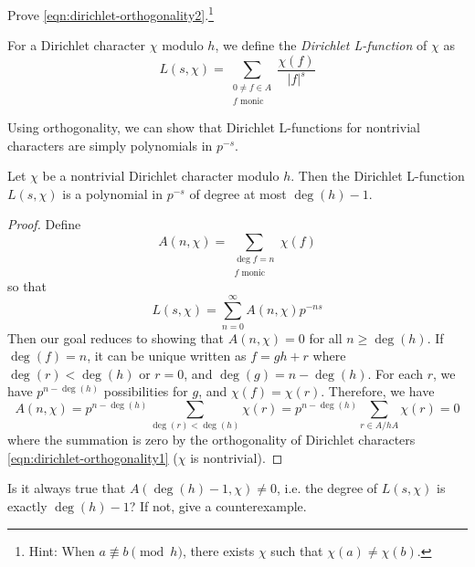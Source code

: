 \begin{exercise}
    Prove \eqref{eqn:dirichlet-orthogonality2}.\footnote{Hint: When $a \not\equiv b \pmod{h}$, there exists $\chi$ such that $\chi(a) \ne \chi(b)$.}
\end{exercise}

\begin{definition}
    For a Dirichlet character $\chi$ modulo $h$, we define the \emph{Dirichlet L-function} of $\chi$ as
    \begin{equation}
        L(s, \chi) = \sum_{\substack{0 \ne f \in A \\ f\text{ monic}}} \frac{\chi(f)}{|f|^s}
        \label{eqn:dirichlet-l-function}
    \end{equation}
\end{definition}

Using orthogonality, we can show that Dirichlet L-functions for nontrivial characters are simply polynomials in $p^{-s}$.
\begin{proposition}
    \label{prop:dirichlet-l-function-poly}
    Let $\chi$ be a nontrivial Dirichlet character modulo $h$.
    Then the Dirichlet L-function $L(s, \chi)$ is a polynomial in $p^{-s}$ of degree at most $\deg(h) - 1$.
\end{proposition}
\begin{proof}
    Define
    \begin{equation}
        A(n, \chi) = \sum_{\substack{\deg f = n \\ f\text{ monic}}} \chi(f)
    \end{equation}
    so that
    \begin{equation}
        L(s, \chi) = \sum_{n = 0}^{\infty} A(n, \chi) p^{-ns}
    \end{equation}
    Then our goal reduces to showing that $A(n, \chi) = 0$ for all $n \geq \deg(h)$.
    If $\deg(f) = n$, it can be unique written as $f = g h + r$ where $\deg(r) < \deg(h)$ or $r = 0$, and $\deg(g) = n - \deg(h)$.
    For each $r$, we have $p^{n - \deg(h)}$ possibilities for $g$, and $\chi(f) = \chi(r)$.
    Therefore, we have
    \[
    A(n, \chi) = p^{n - \deg (h)}\sum_{\deg(r) < \deg(h)} \chi(r) = p^{n - \deg (h)} \sum_{r \in A / hA} \chi(r) = 0
    \]
    where the summation is zero by the orthogonality of Dirichlet characters \eqref{eqn:dirichlet-orthogonality1} ($\chi$ is nontrivial).
\end{proof}

\begin{exercise}
    Is it always true that $A(\deg(h) - 1, \chi) \ne 0$, i.e. the degree of $L(s, \chi)$ is exactly $\deg(h) - 1$?
    If not, give a counterexample.
\end{exercise}

